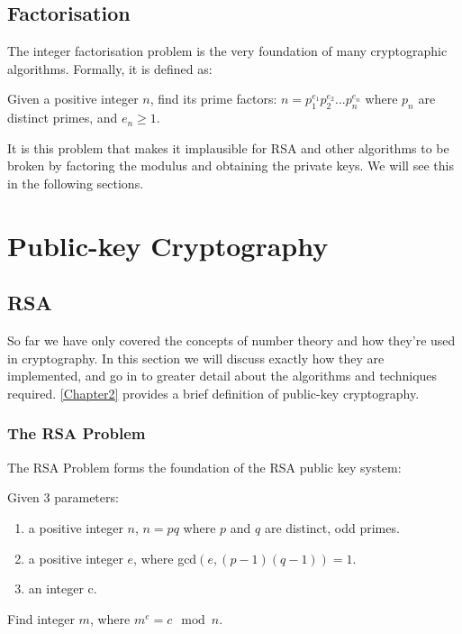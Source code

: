   \subsection{Factorisation}
  
  The integer factorisation problem is the very foundation of many cryptographic algorithms. Formally, it is defined as:
  
  \begin{mathdef}
    Given a positive integer $n$, find its prime factors: $n = p^{e_1}_1p^{e_2}_2...p^{e_n}_n$ where $p_n$ are distinct primes, and $e_n \geq 1$.
  \end{mathdef}
  
  It is this problem that makes it implausible for RSA and other algorithms to be broken by factoring the modulus and obtaining the private keys. We will see this in the following sections.

\section{Public-key Cryptography}

  \subsection{RSA}
  
  So far we have only covered the concepts of number theory and how they're used in cryptography. In this section we will discuss exactly how they are implemented, and go in to greater detail about the algorithms and techniques required. \textsection \ref{Chapter2} provides a brief definition of public-key cryptography.
  
    \subsubsection{The RSA Problem}
    
    The RSA Problem forms the foundation of the RSA public key system:
    
    \begin{mathdef}
      Given 3 parameters:
      \begin{enumerate}
        \item a positive integer $n$, $n=pq$ where $p$ and $q$ are distinct, odd primes.
        \item a positive integer $e$, where gcd$(e, (p-1)(q-1)) = 1$.
        \item an integer c.
      \end{enumerate} 
      Find integer $m$, where $m^e = c \mod{n}$.
    \end{mathdef}
    
